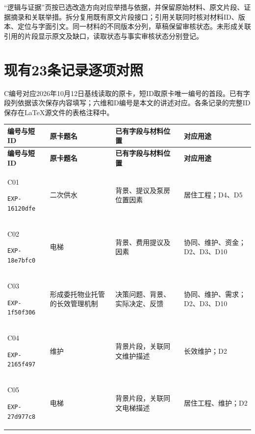 \documentclass[UTF8,11pt,fontset=windows]{ctexart}
\begin{document}
“逻辑与证据”页按已选改造方向对应举措与依据，并保留原始材料、原文片段、证据摘录和关联举措。拆分复用既有原文片段接口；引用关联同时核对材料ID、版本、定位与字面引文。同一材料的不同版本分列，草稿保留审核状态。未形成关联引用的片段显示原文及缺口，读取状态与事实审核状态分别登记。



\section{现有23条记录逐项对照}
C编号对应2026年10月12日基线读取的原卡，短ID取原卡唯一编号的首段。已有字段列依据该次保存内容填写；六维和D编号是本文的讲述对应。各条记录的完整ID保存在LaTeX源文件的表格注释中。
{\small
\begin{longtable}{@{}L{29mm}L{36mm}L{56mm}L{32mm}@{}}
\toprule
\textbf{编号与短ID} & \textbf{原卡题名} & \textbf{已有字段与材料位置} & \textbf{对应用途}\\
\midrule
\endfirsthead
\toprule
\textbf{编号与短ID} & \textbf{原卡题名} & \textbf{已有字段与材料位置} & \textbf{对应用途}\\
\midrule
\endhead
\hypertarget{EXP-16120dfe-9d94-4394-8880-494b385cf2d2}{C01}\newline\texttt{EXP-16120dfe} & 二次供水 & 背景、提议及泵房位置因素 & 居住工程；D4、D5\\
\hypertarget{EXP-18e7bfc0-c19d-429f-8d76-c7fe1b1b370a}{C02}\newline\texttt{EXP-18e7bfc0} & 电梯 & 背景、费用提议及因素 & 协同、维护、资金；D2、D3、D10\\
\hypertarget{EXP-1f50f306-64e5-4335-be56-5c89531c00f2}{C03}\newline\texttt{EXP-1f50f306} & 形成委托物业托管的长效管理机制 & 决策问题、背景、实际决定、反馈 & 协同、维护、需求；D2、D3、D10\\
\hypertarget{EXP-2165f497-e0b6-4647-832f-5d7dd8835e54}{C04}\newline\texttt{EXP-2165f497} & 维护 & 背景片段，关联同文维护描述 & 长效维护；D2\\
\hypertarget{EXP-27d977c8-68a1-4080-8835-f6d3beb33bd2}{C05}\newline\texttt{EXP-27d977c8} & 电梯 & 背景片段，关联同文电梯描述 & 居住工程、维护；D2\\

\end{longtable}}
\end{document}
